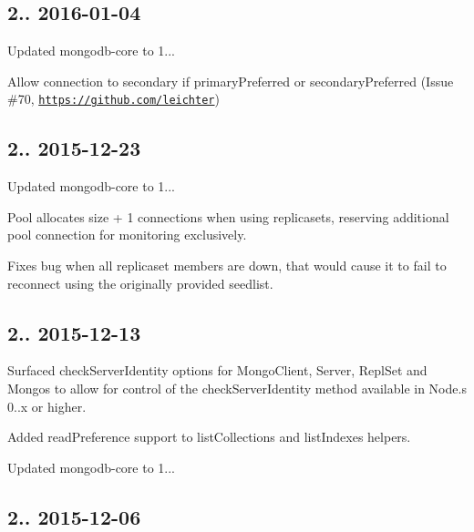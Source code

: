 \subsection*{2.. 2016-\/01-\/04 }


\begin{DoxyItemize}
\item Updated mongodb-\/core to 1...
\item Allow connection to secondary if primary\+Preferred or secondary\+Preferred (Issue \#70, \href{https://github.com/leichter}{\tt https\+://github.\+com/leichter})
\end{DoxyItemize}

\subsection*{2.. 2015-\/12-\/23 }


\begin{DoxyItemize}
\item Updated mongodb-\/core to 1...
\item Pool allocates size + 1 connections when using replicasets, reserving additional pool connection for monitoring exclusively.
\item Fixes bug when all replicaset members are down, that would cause it to fail to reconnect using the originally provided seedlist.
\end{DoxyItemize}

\subsection*{2.. 2015-\/12-\/13 }


\begin{DoxyItemize}
\item Surfaced check\+Server\+Identity options for Mongo\+Client, Server, Repl\+Set and Mongos to allow for control of the check\+Server\+Identity method available in Node.\+s 0..\+x or higher.
\item Added read\+Preference support to list\+Collections and list\+Indexes helpers.
\item Updated mongodb-\/core to 1...
\end{DoxyItemize}

\subsection*{2.. 2015-\/12-\/06 }


